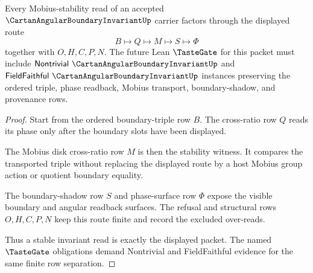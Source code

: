 \begin{theorem}
\label{thm:cartan-angular-boundary-invariant-mobius-stability}
Every Mobius-stability read of an accepted $\CartanAngularBoundaryInvariantUp$ carrier factors through the displayed route
$$
B \longmapsto Q \longmapsto M \longmapsto S \longmapsto \Phi
$$
together with $O,H,C,P,N$. The future Lean $\TasteGate$ for this packet must include $\mathsf{Nontrivial}\ \CartanAngularBoundaryInvariantUp$ and $\mathsf{FieldFaithful}\ \CartanAngularBoundaryInvariantUp$ instances preserving the ordered triple, phase readback, Mobius transport, boundary-shadow, and provenance rows.
\end{theorem}
\begin{proof}
Start from the ordered boundary-triple row $B$. The cross-ratio row $Q$ reads its phase only after the boundary slots have been displayed.

The Mobius disk cross-ratio row $M$ is then the stability witness. It compares the transported triple without replacing the displayed route by a host Mobius group action or quotient boundary equality.

The boundary-shadow row $S$ and phase-surface row $\Phi$ expose the visible boundary and angular readback surfaces. The refusal and structural rows $O,H,C,P,N$ keep this route finite and record the excluded over-reads.

Thus a stable invariant read is exactly the displayed packet. The named $\TasteGate$ obligations demand Nontrivial and FieldFaithful evidence for the same finite row separation.
\end{proof}



